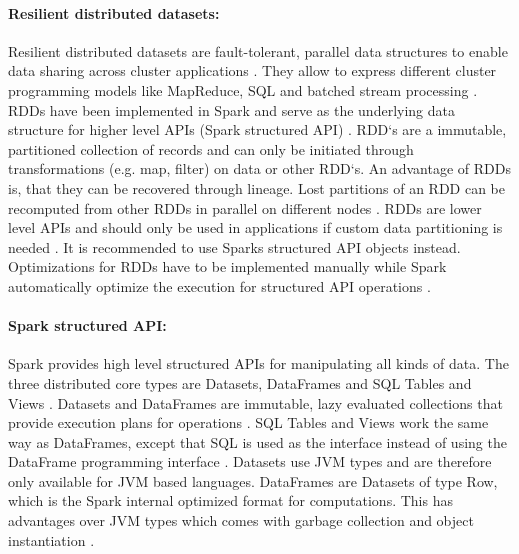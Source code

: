 \paragraph{Resilient distributed datasets:}
Resilient distributed datasets are fault-tolerant, parallel data structures to enable data sharing across cluster applications \cite{Zaharia2012RDDs}. They allow to express different cluster programming models like MapReduce, SQL and batched stream processing \cite{Zaharia2012RDDs}. RDDs have been implemented in Spark and serve as the underlying data structure for higher level APIs (Spark structured API) \cite{Zaharia2012RDDs}.
RDD`s are a immutable, partitioned collection of records and can only be initiated through transformations (e.g. map, filter) on data or other RDD`s.
An advantage of RDDs is, that they can be recovered through lineage. Lost partitions of an RDD can be recomputed from other RDDs in parallel on different nodes \cite{Zaharia2012RDDs}. 
RDDs are lower level APIs and should only be used in applications if custom data partitioning is needed \cite{Chambers2018Spark}. It is recommended to use Sparks structured API objects instead. Optimizations for RDDs have to be implemented manually while Spark automatically optimize the execution for structured API operations \cite{Chambers2018Spark}.


\paragraph{Spark structured API:}
Spark provides high level structured APIs for manipulating all kinds of data. The three distributed core types are Datasets, DataFrames and SQL Tables and Views \cite{Chambers2018Spark}.
Datasets and DataFrames are immutable, lazy evaluated collections that provide execution plans for operations \cite{Chambers2018Spark}. SQL Tables and Views work the same way as DataFrames, except that SQL is used as the interface instead of using the DataFrame programming interface \cite{Chambers2018Spark}.
Datasets use JVM types and are therefore only available for JVM based languages. DataFrames are Datasets of type Row, which is the Spark internal optimized format for computations. This has advantages over JVM types which comes with garbage collection and object instantiation \cite{Chambers2018Spark}.


